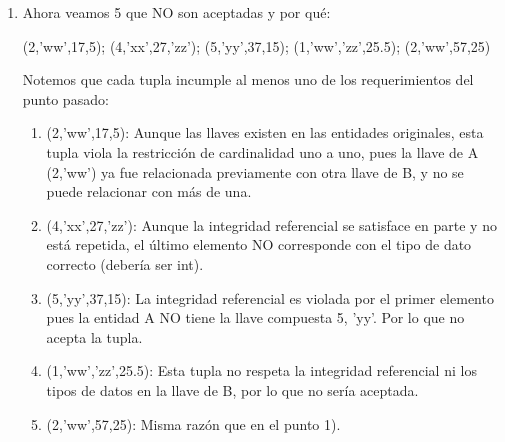\begin{enumerate}[label=\textbf{\alph*.}]
\begin{enumerate}[label=\roman*.]
         (2,'ww',17,5); (4,'xx',27,10); (6,'yy',37,15); (8,'zz',47,20)

         Así que notemos que satisfacen todas las condiciones para que sean insertadas, las dividiré en 3:
         \begin{enumerate}
             \item Preservan la integridad referencial: Esto es, los dos primeros términos de la tupla corresponden a las llaves foráneas de la entidad A, y las siguientes posiciones a la llave foránea de la entidad B, donde efectivamente las 4 tuplas satisfacen que corresponden a las llaves ya existentes predefinidas en el inciso b).
             \item Correcto el tipo de dato: Todos los elementos de las 4 tuplas satisfacen seguir los tipos de datos definidos en el inciso b): (int, cadena, int, int) por lo que cumplen este punto.
             \item Restricción 1:1: Al ser una relación uno a uno, las llaves de A se pueden relacionar solo con una llave de B y viceversa. Las 4 tuplas respetan esto, ya que ninguna llave de A ni de B se repite. Por esta misma regla es imposible insertar una quinta tupla usando las llaves existentes.
         \end{enumerate}

         \item Ahora veamos 5 que NO son aceptadas y por qué:

        (2,'ww',17,5); (4,'xx',27,'zz'); (5,'yy',37,15); (1,'ww','zz',25.5); (2,'ww',57,25)

        Notemos que cada tupla incumple al menos uno de los requerimientos del punto pasado:
        \begin{enumerate}
            \item (2,'ww',17,5): Aunque las llaves existen en las entidades originales, esta tupla viola la restricción de cardinalidad uno a uno, pues la llave de A (2,'ww') ya fue relacionada previamente con otra llave de B, y no se puede relacionar con más de una.
            \item (4,'xx',27,'zz'): Aunque la integridad referencial se satisface en parte y no está repetida, el último elemento NO corresponde con el tipo de dato correcto (debería ser int).
            \item (5,'yy',37,15): La integridad referencial es violada por el primer elemento pues la entidad A NO tiene la llave compuesta 5, 'yy'. Por lo que no acepta la tupla.
            \item (1,'ww','zz',25.5): Esta tupla no respeta la integridad referencial ni los tipos de datos en la llave de B, por lo que no sería aceptada.
            \item (2,'ww',57,25): Misma razón que en el punto 1).
        \end{enumerate}
     \end{enumerate}
\end{enumerate} 
